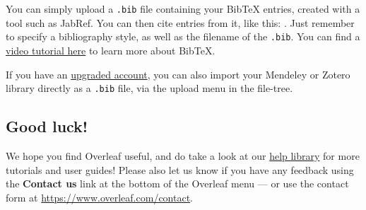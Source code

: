 \documentclass[sigconf]{acmart} %
\begin{document}
You can simply upload a \verb|.bib| file containing your BibTeX entries, created with a tool such as JabRef. You can then cite entries from it, like this: \cite{greenwade93}. Just remember to specify a bibliography style, as well as the filename of the \verb|.bib|. You can find a \href{https://www.overleaf.com/help/97-how-to-include-a-bibliography-using-bibtex}{video tutorial here} to learn more about BibTeX.

If you have an \href{https://www.overleaf.com/user/subscription/plans}{upgraded account}, you can also import your Mendeley or Zotero library directly as a \verb|.bib| file, via the upload menu in the file-tree.

\subsection{Good luck!}

We hope you find Overleaf useful, and do take a look at our \href{https://www.overleaf.com/learn}{help library} for more tutorials and user guides! Please also let us know if you have any feedback using the \textbf{Contact us} link at the bottom of the Overleaf menu --- or use the contact form at \url{https://www.overleaf.com/contact}.



\end{document}
